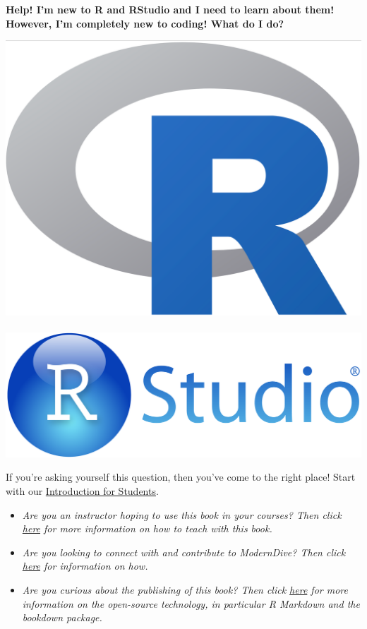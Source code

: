 \documentclass[12pt, krantz2,]{krantz}
\providecommand{\tightlist}{%
  \setlength{\itemsep}{0pt}\setlength{\parskip}{0pt}}
\begin{document}
\textbf{Help! I'm new to R and RStudio and I need to learn about them! However, I'm completely new to coding! What do I do?}

\includegraphics[width=\textwidth,height=0.2\textheight]{images/Rlogo.png} \hfill         \includegraphics[width=\textwidth,height=0.2\textheight]{images/RStudio-Logo-Blue-Gradient.png}

If you're asking yourself this question, then you've come to the right place! Start with our \protect\hyperlink{sec:intro-for-students}{Introduction for Students}.

\begin{itemize}
\tightlist
\item
  \emph{Are you an instructor hoping to use this book in your courses? Then click \protect\hyperlink{sec:intro-instructors}{here} for more information on how to teach with this book.}
\item
  \emph{Are you looking to connect with and contribute to ModernDive? Then click \protect\hyperlink{sec:connect-contribute}{here} for information on how.}
\item
  \emph{Are you curious about the publishing of this book? Then click \protect\hyperlink{sec:about-book}{here} for more information on the open-source technology, in particular R Markdown and the bookdown package.}
\end{itemize}
\end{document}
